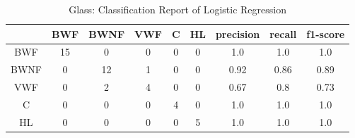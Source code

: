 \documentclass[english]{tktltiki2}
\theoremstyle{definition}
\theoremstyle{remark}
\begin{document}

\begin{table}[H]
	\begin{center}
		\caption{Glass: Classification Report of Logistic Regression}
		\label{tab:quantitative_experimentation_lr_glass_report}
		\begin{tabular}{@{}ccccccccc@{}}
			\toprule
			& BWF & BWNF & VWF & C & HL & precision & recall & f1-score \\ \hline
			\multicolumn{1}{|c|}{BWF} & \multicolumn{1}{c|}{15} & \multicolumn{1}{c|}{0} & \multicolumn{1}{c|}{0} & \multicolumn{1}{c|}{0} & \multicolumn{1}{c|}{0} & \multicolumn{1}{c|}{1.0} & \multicolumn{1}{c|}{1.0} & \multicolumn{1}{c|}{1.0} \\ \hline
			
			\multicolumn{1}{|c|}{BWNF} & \multicolumn{1}{c|}{0} & \multicolumn{1}{c|}{12} & \multicolumn{1}{c|}{1} & \multicolumn{1}{c|}{0} & \multicolumn{1}{c|}{0} & \multicolumn{1}{c|}{0.92} & \multicolumn{1}{c|}{0.86} & \multicolumn{1}{c|}{0.89} \\ \hline
			
			\multicolumn{1}{|c|}{VWF} & \multicolumn{1}{c|}{0} & \multicolumn{1}{c|}{2} & \multicolumn{1}{c|}{4} & \multicolumn{1}{c|}{0} & \multicolumn{1}{c|}{0} & \multicolumn{1}{c|}{0.67} & \multicolumn{1}{c|}{0.8} & \multicolumn{1}{c|}{0.73} \\ \hline
			
			\multicolumn{1}{|c|}{C} & \multicolumn{1}{c|}{0} & \multicolumn{1}{c|}{0} & \multicolumn{1}{c|}{0} & \multicolumn{1}{c|}{4} & \multicolumn{1}{c|}{0} & \multicolumn{1}{c|}{1.0} & \multicolumn{1}{c|}{1.0} & \multicolumn{1}{c|}{1.0} \\ \hline
			
			\multicolumn{1}{|c|}{HL} & \multicolumn{1}{c|}{0} & \multicolumn{1}{c|}{0} & \multicolumn{1}{c|}{0} & \multicolumn{1}{c|}{0} & \multicolumn{1}{c|}{5} & \multicolumn{1}{c|}{1.0} & \multicolumn{1}{c|}{1.0} & \multicolumn{1}{c|}{1.0} \\ \hline
		\end{tabular}
	\end{center}
\end{table}
\end{document}
